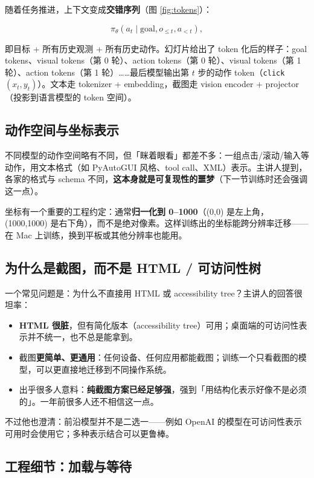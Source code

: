 ﻿\documentclass[a4paper]{article}
\begin{document}
随着任务推进，上下文变成\textbf{交错序列}（图 \ref{fig:tokens}）：

$$
\pi_\theta(a_t \mid \text{goal}, o_{\le t}, a_{<t}),
$$

即目标 + 所有历史观测 + 所有历史动作。幻灯片给出了 token 化后的样子：goal tokens、visual tokens（第 0 轮）、action tokens（第 0 轮）、visual tokens（第 1 轮）、action tokens（第 1 轮）……最后模型输出第 $t$ 步的动作 token（\texttt{click} $(x_t, y_t)$）。文本走 tokenizer + embedding，截图走 vision encoder + projector（投影到语言模型的 token 空间）。

\subsection{动作空间与坐标表示}

不同模型的动作空间略有不同，但「眯着眼看」都差不多：一组点击/滚动/输入等动作，用文本格式（如 PyAutoGUI 风格、tool call、XML）表示。主讲人提到，各家的格式与 schema 不同，\textbf{这本身就是可复现性的噩梦}（下一节训练时还会强调这一点）。

坐标有一个重要的工程约定：通常\textbf{归一化到 0--1000}（(0,0) 是左上角，(1000,1000) 是右下角），而不是绝对像素。这样训练出的坐标能跨分辨率迁移——在 Mac 上训练，换到平板或其他分辨率也能用。

\subsection{为什么是截图，而不是 HTML / 可访问性树}

一个常见问题是：为什么不直接用 HTML 或 accessibility tree？主讲人的回答很坦率：

\begin{itemize}
\item \textbf{HTML 很脏}，但有简化版本（accessibility tree）可用；桌面端的可访问性表示并不统一，也不总是能拿到。
\item 截图\textbf{更简单、更通用}：任何设备、任何应用都能截图；训练一个只看截图的模型，可以更直接地迁移到不同操作系统。
\item 出乎很多人意料：\textbf{纯截图方案已经足够强}，强到「用结构化表示好像不是必须的」。一年前很多人还不相信这一点。
\end{itemize}

不过他也澄清：前沿模型并不是二选一——例如 OpenAI 的模型在可访问性表示可用时会使用它；多种表示结合可以更鲁棒。

\subsection{工程细节：加载与等待}
\end{document}
